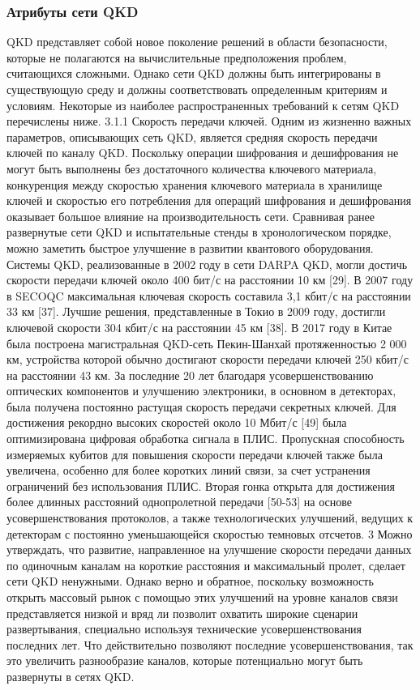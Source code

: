 \subsubsection*{Атрибуты сети QKD}
QKD представляет собой новое поколение решений в области безопасности, которые не полагаются на вычислительные предположения проблем, считающихся сложными. Однако сети QKD должны быть интегрированы в существующую среду и должны соответствовать определенным критериям и условиям. Некоторые из наиболее распространенных требований к сетям QKD перечислены ниже.
3.1.1 Скорость передачи ключей. Одним из жизненно важных параметров, описывающих сеть QKD, является средняя скорость передачи ключей по каналу QKD. Поскольку операции шифрования и дешифрования не могут быть выполнены без достаточного количества ключевого материала, конкуренция между скоростью хранения ключевого материала в хранилище ключей и скоростью его потребления для операций шифрования и дешифрования оказывает большое влияние на производительность сети.
Сравнивая ранее развернутые сети QKD и испытательные стенды в хронологическом порядке, можно заметить быстрое улучшение в развитии квантового оборудования. Системы QKD, реализованные в 2002 году в сети DARPA QKD, могли достичь скорости передачи ключей около 400 бит/с на расстоянии 10 км [29]. В 2007 году в SECOQC максимальная ключевая скорость составила 3,1 кбит/с на расстоянии 33 км [37]. Лучшие решения, представленные в Токио в 2009 году, достигли ключевой скорости 304 кбит/с на расстоянии 45 км [38]. В 2017 году в Китае была построена магистральная QKD-сеть Пекин-Шанхай протяженностью 2 000 км, устройства которой обычно достигают скорости передачи ключей 250 кбит/с на расстоянии 43 км.
За последние 20 лет благодаря усовершенствованию оптических компонентов и улучшению электроники, в основном в детекторах, была получена постоянно растущая скорость передачи секретных ключей. Для достижения рекордно высоких скоростей около 10 Мбит/с [49] была оптимизирована цифровая обработка сигнала в ПЛИС. Пропускная способность измеряемых кубитов для повышения скорости передачи ключей также была увеличена, особенно для более коротких линий связи, за счет устранения ограничений без использования ПЛИС. Вторая гонка открыта для достижения более длинных расстояний однопролетной передачи [50-53] на основе усовершенствования протоколов, а также технологических улучшений, ведущих к детекторам с постоянно уменьшающейся скоростью темновых отсчетов. 3 Можно утверждать, что развитие, направленное на улучшение скорости передачи данных по одиночным каналам на короткие расстояния и максимальный пролет, сделает сети QKD ненужными. Однако верно и обратное, поскольку возможность открыть массовый рынок с помощью этих улучшений на уровне каналов связи представляется низкой и вряд ли позволит охватить широкие сценарии развертывания, специально используя технические усовершенствования последних лет. Что действительно позволяют последние усовершенствования, так это увеличить разнообразие каналов, которые потенциально могут быть развернуты в сетях QKD.
